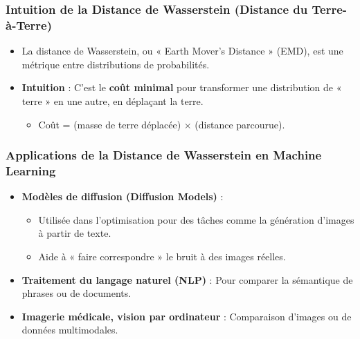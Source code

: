 \documentclass{beamer}
\begin{document}
\begin{frame}
	\frametitle{Intuition de la Distance de Wasserstein (Distance du Terre-à-Terre)}
	\begin{itemize}
		\item La distance de Wasserstein, ou « Earth Mover's Distance » (EMD), est une métrique entre distributions de probabilités.
		\item \textbf{Intuition} : C'est le \textbf{coût minimal} pour transformer une distribution de « terre » en une autre, en déplaçant la terre.
		      \begin{itemize}
			      \item Coût = (masse de terre déplacée) $\times$ (distance parcourue).
		      \end{itemize}
	\end{itemize}
\end{frame}

\begin{frame}
	\frametitle{Applications de la Distance de Wasserstein en Machine Learning}
	\begin{itemize}
		\item \textbf{Modèles de diffusion (Diffusion Models)} :
		      \begin{itemize}
			      \item Utilisée dans l'optimisation pour des tâches comme la génération d'images à partir de texte.
			      \item Aide à « faire correspondre » le bruit à des images réelles.
		      \end{itemize}
		\item \textbf{Traitement du langage naturel (NLP)} : Pour comparer la sémantique de phrases ou de documents.
		\item \textbf{Imagerie médicale, vision par ordinateur} : Comparaison d'images ou de données multimodales.
	\end{itemize}
\end{frame}

\end{document}
